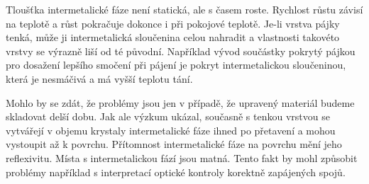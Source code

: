 Tloušťka intermetalické fáze není statická, ale s časem roste. Rychlost růstu závisí na teplotě a růst pokračuje dokonce i při pokojové teplotě. Je-li vrstva pájky tenká, může ji intermetalická sloučenina celou nahradit a vlastnosti takovéto vrstvy se výrazně liší od té původní. Například vývod součástky pokrytý pájkou pro dosažení lepšího smočení při pájení je pokryt intermetalickou sloučeninou, která je nesmáčivá a má vyšší teplotu tání.

Mohlo by se zdát, že problémy jsou jen v případě, že upravený materiál budeme skladovat
delší dobu. Jak ale výzkum ukázal, současně s tenkou vrstvou se vytvářejí v objemu krystaly intermetalické fáze ihned po přetavení a mohou vystoupit až k povrchu. Přítomnost intermetalické fáze na povrchu mění jeho reflexivitu. Místa s intermetalickou fází jsou matná. Tento fakt by mohl způsobit problémy například s interpretací optické kontroly korektně zapájených
spojů. 


















